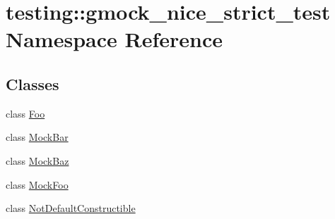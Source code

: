 \hypertarget{namespacetesting_1_1gmock__nice__strict__test}{}\section{testing\+::gmock\+\_\+nice\+\_\+strict\+\_\+test Namespace Reference}
\label{namespacetesting_1_1gmock__nice__strict__test}
\subsection*{Classes}
\begin{DoxyCompactItemize}
\item 
class \mbox{\hyperlink{classtesting_1_1gmock__nice__strict__test_1_1_foo}{Foo}}
\item 
class \mbox{\hyperlink{classtesting_1_1gmock__nice__strict__test_1_1_mock_bar}{Mock\+Bar}}
\item 
class \mbox{\hyperlink{classtesting_1_1gmock__nice__strict__test_1_1_mock_baz}{Mock\+Baz}}
\item 
class \mbox{\hyperlink{classtesting_1_1gmock__nice__strict__test_1_1_mock_foo}{Mock\+Foo}}
\item 
class \mbox{\hyperlink{classtesting_1_1gmock__nice__strict__test_1_1_not_default_constructible}{Not\+Default\+Constructible}}
\end{DoxyCompactItemize}
